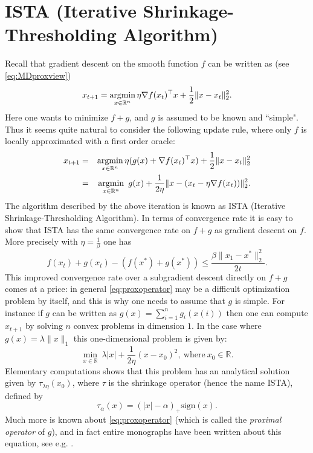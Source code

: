 \section*{ISTA (Iterative Shrinkage-Thresholding Algorithm)}
Recall that gradient descent on the smooth function $f$ can be written as (see \eqref{eq:MDproxview})
$$x_{t+1} = \mathop{\mathrm{argmin}}_{x \in \mathbb{R}^n} \eta \nabla f(x_t)^{\top} x + \frac{1}{2} \|x - x_t\|^2_2 .$$
Here one wants to minimize $f+g$, and $g$ is assumed to be known and ``simple". Thus it seems quite natural to consider the following update rule, where only $f$ is locally approximated with a first order oracle:
\begin{eqnarray}
x_{t+1} & = & \mathop{\mathrm{argmin}}_{x \in \mathbb{R}^n} \eta (g(x) + \nabla f(x_t)^{\top} x) + \frac{1}{2} \|x - x_t\|^2_2 \notag \\
& = & \mathop{\mathrm{argmin}}_{x \in \mathbb{R}^n} \ g(x) + \frac{1}{2\eta} \|x - (x_t - \eta \nabla f(x_t)) \|_2^2 . \label{eq:proxoperator}
\end{eqnarray}
The algorithm described by the above iteration is known as ISTA (Iterative Shrinkage-Thresholding Algorithm). In terms of convergence rate it is easy to show that ISTA has the same convergence rate on $f+g$ as gradient descent on $f$. More precisely with $\eta=\frac{1}{\beta}$ one has
$$f(x_t) + g(x_t) - (f(x^*) + g(x^*)) \leq \frac{\beta \|x_1 - x^*\|^2_2}{2 t} .$$
This improved convergence rate over a subgradient descent directly on $f+g$ comes at a price: in general \eqref{eq:proxoperator} may be a difficult optimization problem by itself, and this is why one needs to assume that $g$ is simple. For instance if $g$ can be written as $g(x) = \sum_{i=1}^n g_i(x(i))$ then one can compute $x_{t+1}$ by solving $n$ convex problems in dimension $1$. In the case where $g(x) = \lambda \|x\|_1$ this one-dimensional problem is given by:
$$\min_{x \in \mathbb{R}} \ \lambda |x| + \frac{1}{2 \eta}(x - x_0)^2, \ \text{where} \ x_0 \in \mathbb{R} .$$
Elementary computations shows that this problem has an analytical solution given by $\tau_{\lambda \eta}(x_0)$,
where $\tau$ is the shrinkage operator (hence the name ISTA), defined by
$$\tau_{\alpha}(x) = (|x|-\alpha)_+ \mathrm{sign}(x) .$$
Much more is known about \eqref{eq:proxoperator} (which is called the {\em proximal operator} of $g$), and in fact entire monographs have been written about this equation, see e.g. \cite{PB13, BJMO12}.

